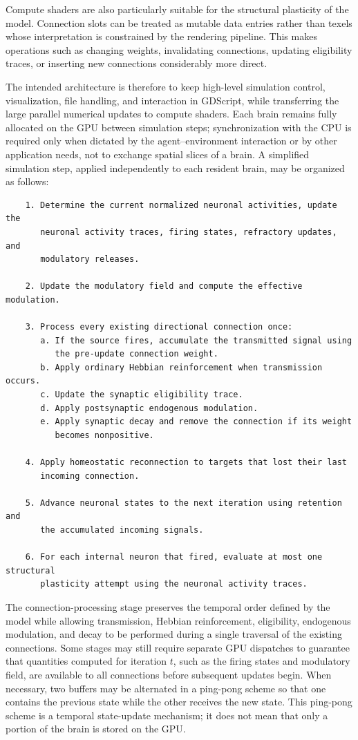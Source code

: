 \documentclass[12pt,a4paper]{article}
\begin{document}
	Compute shaders are also particularly suitable for the structural plasticity of the model. Connection slots can be treated as mutable data entries rather than texels whose interpretation is constrained by the rendering pipeline. This makes operations such as changing weights, invalidating connections, updating eligibility traces, or inserting new connections considerably more direct.

	The intended architecture is therefore to keep high-level simulation control, visualization, file handling, and interaction in GDScript, while transferring the large parallel numerical updates to compute shaders. Each brain remains fully allocated on the GPU between simulation steps; synchronization with the CPU is required only when dictated by the agent--environment interaction or by other application needs, not to exchange spatial slices of a brain. A simplified simulation step, applied independently to each resident brain, may be organized as follows:

	\begin{verbatim}
	1. Determine the current normalized neuronal activities, update the
	   neuronal activity traces, firing states, refractory updates, and
	   modulatory releases.

	2. Update the modulatory field and compute the effective modulation.

	3. Process every existing directional connection once:
	   a. If the source fires, accumulate the transmitted signal using
		  the pre-update connection weight.
	   b. Apply ordinary Hebbian reinforcement when transmission occurs.
	   c. Update the synaptic eligibility trace.
	   d. Apply postsynaptic endogenous modulation.
	   e. Apply synaptic decay and remove the connection if its weight
		  becomes nonpositive.

	4. Apply homeostatic reconnection to targets that lost their last
	   incoming connection.

	5. Advance neuronal states to the next iteration using retention and
	   the accumulated incoming signals.

	6. For each internal neuron that fired, evaluate at most one structural
	   plasticity attempt using the neuronal activity traces.
	\end{verbatim}

	The connection-processing stage preserves the temporal order defined by the model while allowing transmission, Hebbian reinforcement, eligibility, endogenous modulation, and decay to be performed during a single traversal of the existing connections. Some stages may still require separate GPU dispatches to guarantee that quantities computed for iteration $t$, such as the firing states and modulatory field, are available to all connections before subsequent updates begin. When necessary, two buffers may be alternated in a ping-pong scheme so that one contains the previous state while the other receives the new state. This ping-pong scheme is a temporal state-update mechanism; it does not mean that only a portion of the brain is stored on the GPU.					
				
\end{document}
